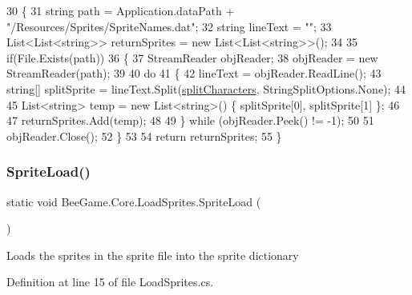 \begin{DoxyCode}
30         \{
31             \textcolor{keywordtype}{string} path = Application.dataPath + \textcolor{stringliteral}{"/Resources/Sprites/SpriteNames.dat"};
32             \textcolor{keywordtype}{string} lineText = \textcolor{stringliteral}{""};
33             List<List<string>> returnSprites = \textcolor{keyword}{new} List<List<string>>();
34 
35             \textcolor{keywordflow}{if}(File.Exists(path))
36             \{
37                 StreamReader objReader;
38                 objReader = \textcolor{keyword}{new} StreamReader(path);
39 
40                 \textcolor{keywordflow}{do}
41                 \{
42                     lineText = objReader.ReadLine();
43                     \textcolor{keywordtype}{string}[] splitSprite = lineText.Split(\hyperlink{class_bee_game_1_1_core_1_1_load_sprites_aaef6cb35c513009a03c13d1307d5bcba}{splitCharacters}, 
      StringSplitOptions.None);
44 
45                     List<string> temp = \textcolor{keyword}{new} List<string>() \{ splitSprite[0], splitSprite[1] \};
46 
47                     returnSprites.Add(temp);
48 
49                 \} \textcolor{keywordflow}{while} (objReader.Peek() != -1);
50 
51                 objReader.Close();
52             \}
53 
54             \textcolor{keywordflow}{return} returnSprites;
55         \}
\end{DoxyCode}
\mbox{\label{class_bee_game_1_1_core_1_1_load_sprites_a501313d9f5961420d4a9a0ede72f6907}} 
\subsubsection{\texorpdfstring{Sprite\+Load()}{SpriteLoad()}}
{\footnotesize\ttfamily static void Bee\+Game.\+Core.\+Load\+Sprites.\+Sprite\+Load (\begin{DoxyParamCaption}{ }\end{DoxyParamCaption})\hspace{0.3cm}{\ttfamily [static]}}



Loads the sprites in the sprite file into the sprite dictionary 



Definition at line 15 of file Load\+Sprites.\+cs.



